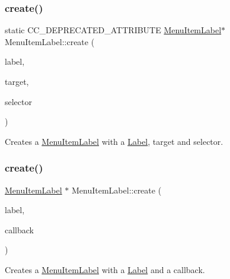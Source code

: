 \subsubsection{\texorpdfstring{create()}{create()}\hspace{0.1cm}{\footnotesize\ttfamily [2/6]}}
{\footnotesize\ttfamily static C\+C\+\_\+\+D\+E\+P\+R\+E\+C\+A\+T\+E\+D\+\_\+\+A\+T\+T\+R\+I\+B\+U\+TE \hyperlink{classMenuItemLabel}{Menu\+Item\+Label}$\ast$ Menu\+Item\+Label\+::create (\begin{DoxyParamCaption}\item[{\hyperlink{classNode}{Node} $\ast$}]{label,  }\item[{\hyperlink{classRef}{Ref} $\ast$}]{target,  }\item[{S\+E\+L\+\_\+\+Menu\+Handler}]{selector }\end{DoxyParamCaption})\hspace{0.3cm}{\ttfamily [static]}}

Creates a \hyperlink{classMenuItemLabel}{Menu\+Item\+Label} with a \hyperlink{classLabel}{Label}, target and selector. \mbox{\label{classMenuItemLabel_a5d8418ae1c7adc97ebdee2c4a64187e5}} 
\subsubsection{\texorpdfstring{create()}{create()}\hspace{0.1cm}{\footnotesize\ttfamily [3/6]}}
{\footnotesize\ttfamily \hyperlink{classMenuItemLabel}{Menu\+Item\+Label} $\ast$ Menu\+Item\+Label\+::create (\begin{DoxyParamCaption}\item[{\hyperlink{classNode}{Node} $\ast$}]{label,  }\item[{const cc\+Menu\+Callback \&}]{callback }\end{DoxyParamCaption})\hspace{0.3cm}{\ttfamily [static]}}

Creates a \hyperlink{classMenuItemLabel}{Menu\+Item\+Label} with a \hyperlink{classLabel}{Label} and a callback. \mbox{\label{classMenuItemLabel_aa344a5f65380e036ed835395930e02da}} 

